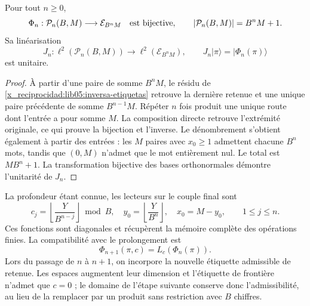 \begin{theorem}
\label{x_reciprocidad:lib05:teo-rutas}
Pour tout \(n\geq0\),
\begin{equation}
 \Phi_n:\mathcal P_n(B,M)\longrightarrow\mathcal E_{B^nM}
 \quad\hbox{est bijective},\qquad
 |\mathcal P_n(B,M)|=B^nM+1.
 \label{x_reciprocidad:lib05:biyeccion-rutas}
\end{equation}
Sa linéarisation
\begin{equation}
 J_n:\ell^2(\mathcal P_n(B,M))\longrightarrow
          \ell^2(\mathcal E_{B^nM}),\qquad
 J_n|\pi\rangle=|\Phi_n(\pi)\rangle
 \label{x_reciprocidad:lib05:jn}
\end{equation}
est unitaire.
\end{theorem}

\begin{proof}
À partir d’une paire de somme \(B^nM\), le résidu de
\eqref{x_reciprocidad:lib05:inversa-etiquetas} retrouve la dernière retenue et une
unique paire précédente de somme \(B^{n-1}M\). Répéter \(n\) fois
produit une unique route dont l’entrée a pour somme \(M\). La composition
directe retrouve l’extrémité originale, ce qui prouve la bijection et
l’inverse. Le dénombrement s’obtient également à partir des entrées : les
\(M\) paires avec \(x_0\geq1\) admettent chacune \(B^n\) mots,
tandis que \((0,M)\) n’admet que le mot entièrement
nul. Le total est \(MB^n+1\). La transformation bijective des
bases orthonormales démontre l’unitarité de \(J_n\).
\end{proof}

La profondeur étant connue, les lecteurs sur le couple final sont
\begin{equation}
 c_j=\left\lfloor\frac{Y}{B^{n-j}}\right\rfloor\bmod B,
 \quad y_0=\left\lfloor\frac{Y}{B^n}\right\rfloor,
 \quad x_0=M-y_0,
 \qquad 1\leq j\leq n.
 \label{x_reciprocidad:lib05:lectores-ruta}
\end{equation}
Ces fonctions sont diagonales et récupèrent la mémoire complète des
opérations finies. La compatibilité avec le prolongement est
\begin{equation}
 \Phi_{n+1}(\pi,c)=L_c(\Phi_n(\pi)).
 \label{x_reciprocidad:lib05:compatibilidad-prolongacion}
\end{equation}
Lors du passage de \(n\) à \(n+1\), on incorpore la nouvelle étiquette
admissible de retenue. Les espaces augmentent leur dimension et
l’étiquette de frontière n’admet que \(c=0\) ; le domaine de
l’étape suivante conserve donc l’admissibilité, au lieu de la remplacer
par un produit sans restriction avec \(B\) chiffres.

